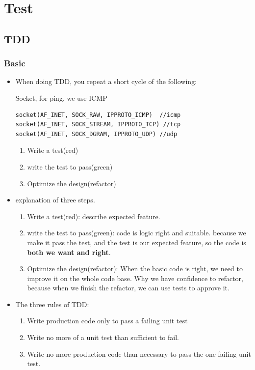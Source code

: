 \documentclass[a4paper,11pt,twoside]{book}
\begin{document}
\chapter{Test}
\section{TDD}
\subsection{Basic}

\begin{itemize}
	\item When doing TDD, you repeat a short cycle of the following:
	
	Socket, for ping, we use ICMP
\begin{lstlisting}
socket(AF_INET, SOCK_RAW, IPPROTO_ICMP)  //icmp
socket(AF_INET, SOCK_STREAM, IPPROTO_TCP) //tcp
socket(AF_INET, SOCK_DGRAM, IPPROTO_UDP) //udp
\end{lstlisting}	
	
	\begin{enumerate}
		\item Write a test(red)
		\item write the test to pass(green)
		\item Optimize the design(refactor)
	\end{enumerate}
	
	\item explanation of three steps. 
	\begin{enumerate}
		\item Write a test(red): describe expected feature. 
		
		\item write the test to pass(green): code is logic right and suitable. because we make it pass the test, and the test is our expected feature, so the code is \textbf{both we want and right}.
		
		\item Optimize the design(refactor): When the basic code is right, we need to improve it on the whole code base.  Why we have confidence to refactor, because when we finish the refactor, we can use tests to approve it. 
	\end{enumerate}

	\item The three rules of TDD:
	\begin{enumerate}
		\item Write production code only to pass a failing unit test
		\item Write no more of a unit test than sufficient to fail.
		\item Write no more production code than necessary to pass the one failing unit test. 
	\end{enumerate}


\end{itemize}
\end{document}
